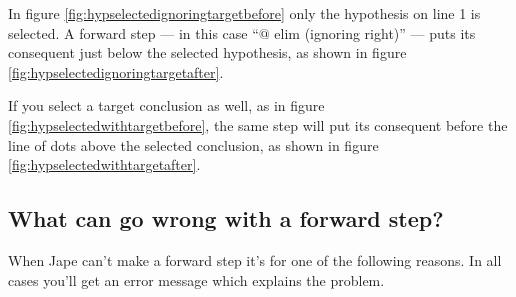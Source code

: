 \documentclass[11pt]{book}
\newcommand{\figref}[1]{figure \ref{fig:#1}}
\begin{document}
In \figref{hypselectedignoringtargetbefore} only the hypothesis on line 1 is selected. A forward step --- in this case ``$@$ elim (ignoring right)'' --- puts its consequent just below the selected hypothesis, as shown in \figref{hypselectedignoringtargetafter}.

If you select a target conclusion as well, as in \figref{hypselectedwithtargetbefore}, the same step will put its consequent before the line of dots above the selected conclusion, as shown in \figref{hypselectedwithtargetafter}.

\subsection{What can go wrong with a forward step?}

When Jape can't make a forward step it's for one of the following reasons. In all cases you'll get an error message which explains the problem.
\end{document}
